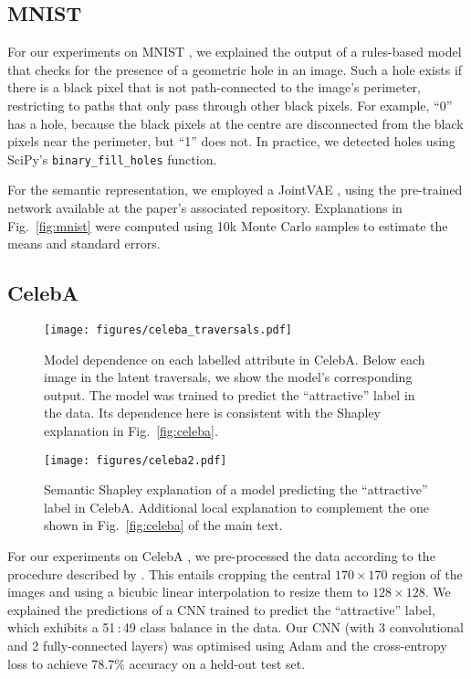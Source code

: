 \documentclass{article}
\DeclareRobustCommand{\Fig}[1]{Fig.~\ref{fig:#1}}
\begin{document}
\subsection{MNIST}
\label{app:mnist}


For our experiments on MNIST \citep{mnist2010}, we explained the output of a rules-based model that checks for the presence of a geometric hole in an image. Such a hole exists if there is a black pixel that is not path-connected to the image's perimeter, restricting to paths that only pass through other black pixels. For example, ``0'' has a hole, because the black pixels at the centre are disconnected from the black pixels near the perimeter, but ``1'' does not. In practice, we detected holes using SciPy's \texttt{binary\_fill\_holes} function.

For the semantic representation, we employed a JointVAE \citep{JointVAE}, using the pre-trained network available at the paper's associated repository. Explanations in \Fig{mnist} were computed using 10k Monte Carlo samples to estimate the means and standard errors.


\subsection{CelebA}
\label{app:celeba}


\begin{figure}[!t]
\centering
\texttt{[image: figures/celeba\_traversals.pdf]}
\caption{Model dependence on each labelled attribute in CelebA. Below each image in the latent traversals, we show the model's corresponding output. The model was trained to predict the ``attractive'' label in the data. Its dependence here is consistent with the Shapley explanation in \Fig{celeba}.}
\label{fig:celeba_traversal}
\vskip 4mm
\end{figure}


\begin{figure}[!t]
\centering
\texttt{[image: figures/celeba2.pdf]}
\caption{Semantic Shapley explanation of a model predicting the ``attractive'' label in CelebA. Additional local explanation to complement the one shown in \Fig{celeba} of the main text.}
\label{fig:celeba_additional}
\vskip 4mm
\end{figure}


For our experiments on CelebA \citep{celeba15}, we pre-processed the data according to the procedure described by \cite{Stgan}. This entails cropping the central $170 \times 170$ region of the images and using a bicubic linear interpolation to resize them to $128 \times 128$. We explained the predictions of a CNN trained to predict the ``attractive'' label, which exhibits a 51\,:\,49 class balance in the data. Our CNN (with 3 convolutional and 2 fully-connected layers) was optimised using Adam and the cross-entropy loss to achieve 78.7\% accuracy on a held-out test set.
\end{document}
